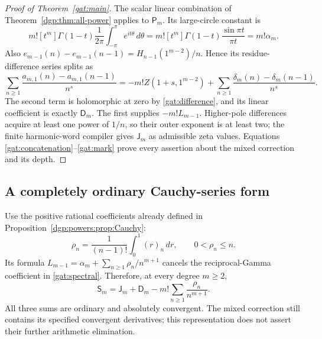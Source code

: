 \begin{proof}[Proof of Theorem~\ref{gat:main}]
The scalar linear combination of Theorem~\ref{dgp:thm:all-power}
applies to $\mathsf P_m$.  Its large-circle constant is
\[
 m![t^m]\Gamma(1-t)\frac1{2\pi}\int_{-\pi}^{\pi}e^{it\theta}\,d\theta
   =m![t^m]\Gamma(1-t)\frac{\sin\pi t}{\pi t}=m!\alpha_m.
\]
Also $e_{m-1}(n)-e_{m-1}(n-1)=H_{n-1}(1^{m-2})/n$.
Hence its residue-difference series splits as
\[
 \sum_{n\ge1}\frac{a_{m,1}(n)-a_{m,1}(n-1)}{n^s}
  =-m!Z(1+s,1^{m-2})
       +\sum_{n\ge1}\frac{\delta_m(n)-\delta_m(n-1)}{n^s}.
\]
The second term is holomorphic at zero by \eqref{gat:difference},
and its linear coefficient is exactly $\mathsf D_m$.
The first supplies $-m!L_{m-1}$.  Higher-pole differences acquire
at least one power of $1/n$, so their outer exponent is at least two;
the finite harmonic-word compiler gives $\mathsf J_m$ as admissible
zeta values.  Equations \eqref{gat:concatenation}--\eqref{gat:mark}
prove every assertion about the mixed correction and its depth.
\end{proof}

\subsection{A completely ordinary Cauchy-series form}

Use the positive rational coefficients already defined in
Proposition~\ref{dgp:powers:prop:Cauchy}:
\[
 \rho_n=\frac1{(n-1)!}\int_0^1(r)_n\,dr,\qquad 0<\rho_n\le n.
\]
Its formula $L_{m-1}=\alpha_m+\sum_{n\ge1}\rho_n/n^{m+1}$
cancels the reciprocal-Gamma coefficient in \eqref{gat:spectral}.
Therefore, at every degree $m\ge2$,
\begin{equation}\label{gat:ordinary}
 \boxed{\mathsf S_m=\mathsf J_m+\mathsf D_m
                       -m!\sum_{n\ge1}\frac{\rho_n}{n^{m+1}}.}
\end{equation}
All three sums are ordinary and absolutely convergent.  The mixed
correction still contains its specified convergent derivatives;
this representation does not assert their further arithmetic elimination.

